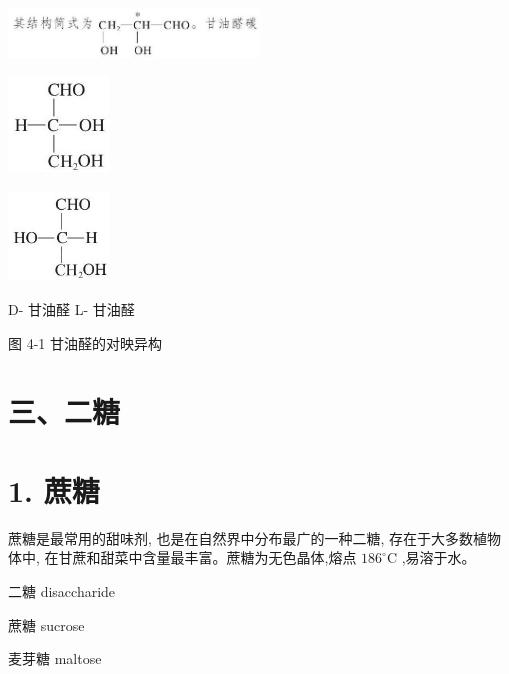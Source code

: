 \documentclass[10pt]{article}
\begin{document}
\begin{center}
\includegraphics[max width=0.5\textwidth]{images/0190efc5-b58a-7c43-bfb0-e0a030df9cfd_109_801886.jpg}
\end{center}

\begin{center}
\includegraphics[max width=0.2\textwidth]{images/0190efc5-b58a-7c43-bfb0-e0a030df9cfd_110_948985.jpg}
\end{center}

\begin{center}
\includegraphics[max width=0.2\textwidth]{images/0190efc5-b58a-7c43-bfb0-e0a030df9cfd_110_208853.jpg}
\end{center}

D- 甘油醛 L- 甘油醛

图 4-1 甘油醛的对映异构

\section*{三、二糖}

\section*{1. 蔗糖}

蔗糖是最常用的甜味剂, 也是在自然界中分布最广的一种二糖, 存在于大多数植物体中, 在甘蔗和甜菜中含量最丰富。蔗糖为无色晶体,熔点 \({186}^{ \circ }\mathrm{C}\) ,易溶于水。

\begin{mdframed}

二糖 disaccharide

蔗糖 sucrose

麦芽糖 maltose

\end{mdframed}
\end{document}
